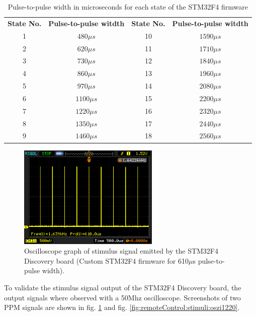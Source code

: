 \begin{table}[H]
\centering
	\begin{tabular}{c|c||c|c}
\hline
\textbf{State No.} & \textbf{Pulse-to-pulse witdth} & \textbf{State No.} & \textbf{Pulse-to-pulse witdth}\\
\hhline{=|=#=|=}
1 & $480\mu s$ & 10 & $1590\mu s$\\
2 & $620\mu s$ & 11 & $1710\mu s$\\
3 & $730\mu s$ & 12 & $1840\mu s$\\
4 & $860\mu s$ & 13 & $1960\mu s$\\
5 & $970\mu s$ & 14 & $2080\mu s$\\
6 & $1100\mu s$ & 15 & $2200\mu s$\\
7 & $1220\mu s$ & 16 & $2320\mu s$\\
8 & $1350\mu s$ & 17 & $2440\mu s$\\
9 & $1460\mu s$ & 18 & $2560\mu s$\\
\hline
	\end{tabular}
	\caption[Pulse-to-pulse width of STM32F4 firmware states]{Pulse-to-pulse width in microseconds for each state of the STM32F4 firmware}
	\label{tab:remoteControl:stimuli:stm32f4States}
\end{table}

\begin{figure}[H]
    \centering
    \includegraphics[width=0.60\textwidth]{fig/ch-ppm-kernel-driver/osci_ppm_610us}
    \caption[Oscilloscope graph of stimulus signal (610µs)]{Oscilloscope graph of stimulus signal emitted by the STM32F4 Discovery board (Custom STM32F4 firmware for 610$\mu$s pulse-to-pulse width).}
    \label{fig:remoteControl:stimuli:oszi610}
\end{figure}

To validate the stimulus signal output of the STM32F4 Discovery board, the output signals where observed with a 50Mhz oscilloscope. Screenshots of two PPM signals are shown in fig. \ref{fig:remoteControl:stimuli:oszi610} and fig. \ref{fig:remoteControl:stimuli:oszi1220}.

